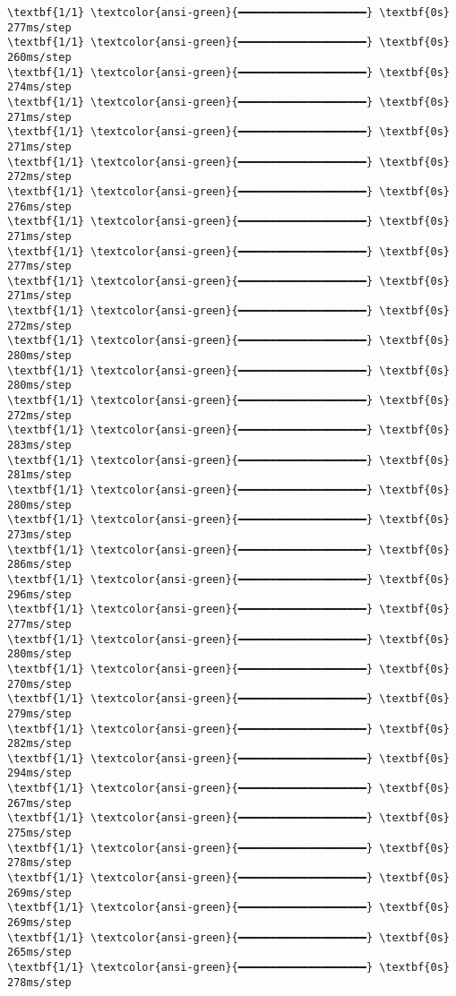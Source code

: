 \documentclass[11pt]{article}
\begin{document}
\begin{Verbatim}[commandchars=\\\{\}]
\textbf{1/1} \textcolor{ansi-green}{━━━━━━━━━━━━━━━━━━━━} \textbf{0s} 277ms/step
\textbf{1/1} \textcolor{ansi-green}{━━━━━━━━━━━━━━━━━━━━} \textbf{0s} 260ms/step
\textbf{1/1} \textcolor{ansi-green}{━━━━━━━━━━━━━━━━━━━━} \textbf{0s} 274ms/step
\textbf{1/1} \textcolor{ansi-green}{━━━━━━━━━━━━━━━━━━━━} \textbf{0s} 271ms/step
\textbf{1/1} \textcolor{ansi-green}{━━━━━━━━━━━━━━━━━━━━} \textbf{0s} 271ms/step
\textbf{1/1} \textcolor{ansi-green}{━━━━━━━━━━━━━━━━━━━━} \textbf{0s} 272ms/step
\textbf{1/1} \textcolor{ansi-green}{━━━━━━━━━━━━━━━━━━━━} \textbf{0s} 276ms/step
\textbf{1/1} \textcolor{ansi-green}{━━━━━━━━━━━━━━━━━━━━} \textbf{0s} 271ms/step
\textbf{1/1} \textcolor{ansi-green}{━━━━━━━━━━━━━━━━━━━━} \textbf{0s} 277ms/step
\textbf{1/1} \textcolor{ansi-green}{━━━━━━━━━━━━━━━━━━━━} \textbf{0s} 271ms/step
\textbf{1/1} \textcolor{ansi-green}{━━━━━━━━━━━━━━━━━━━━} \textbf{0s} 272ms/step
\textbf{1/1} \textcolor{ansi-green}{━━━━━━━━━━━━━━━━━━━━} \textbf{0s} 280ms/step
\textbf{1/1} \textcolor{ansi-green}{━━━━━━━━━━━━━━━━━━━━} \textbf{0s} 280ms/step
\textbf{1/1} \textcolor{ansi-green}{━━━━━━━━━━━━━━━━━━━━} \textbf{0s} 272ms/step
\textbf{1/1} \textcolor{ansi-green}{━━━━━━━━━━━━━━━━━━━━} \textbf{0s} 283ms/step
\textbf{1/1} \textcolor{ansi-green}{━━━━━━━━━━━━━━━━━━━━} \textbf{0s} 281ms/step
\textbf{1/1} \textcolor{ansi-green}{━━━━━━━━━━━━━━━━━━━━} \textbf{0s} 280ms/step
\textbf{1/1} \textcolor{ansi-green}{━━━━━━━━━━━━━━━━━━━━} \textbf{0s} 273ms/step
\textbf{1/1} \textcolor{ansi-green}{━━━━━━━━━━━━━━━━━━━━} \textbf{0s} 286ms/step
\textbf{1/1} \textcolor{ansi-green}{━━━━━━━━━━━━━━━━━━━━} \textbf{0s} 296ms/step
\textbf{1/1} \textcolor{ansi-green}{━━━━━━━━━━━━━━━━━━━━} \textbf{0s} 277ms/step
\textbf{1/1} \textcolor{ansi-green}{━━━━━━━━━━━━━━━━━━━━} \textbf{0s} 280ms/step
\textbf{1/1} \textcolor{ansi-green}{━━━━━━━━━━━━━━━━━━━━} \textbf{0s} 270ms/step
\textbf{1/1} \textcolor{ansi-green}{━━━━━━━━━━━━━━━━━━━━} \textbf{0s} 279ms/step
\textbf{1/1} \textcolor{ansi-green}{━━━━━━━━━━━━━━━━━━━━} \textbf{0s} 282ms/step
\textbf{1/1} \textcolor{ansi-green}{━━━━━━━━━━━━━━━━━━━━} \textbf{0s} 294ms/step
\textbf{1/1} \textcolor{ansi-green}{━━━━━━━━━━━━━━━━━━━━} \textbf{0s} 267ms/step
\textbf{1/1} \textcolor{ansi-green}{━━━━━━━━━━━━━━━━━━━━} \textbf{0s} 275ms/step
\textbf{1/1} \textcolor{ansi-green}{━━━━━━━━━━━━━━━━━━━━} \textbf{0s} 278ms/step
\textbf{1/1} \textcolor{ansi-green}{━━━━━━━━━━━━━━━━━━━━} \textbf{0s} 269ms/step
\textbf{1/1} \textcolor{ansi-green}{━━━━━━━━━━━━━━━━━━━━} \textbf{0s} 269ms/step
\textbf{1/1} \textcolor{ansi-green}{━━━━━━━━━━━━━━━━━━━━} \textbf{0s} 265ms/step
\textbf{1/1} \textcolor{ansi-green}{━━━━━━━━━━━━━━━━━━━━} \textbf{0s} 278ms/step

\end{Verbatim}
\end{document}
